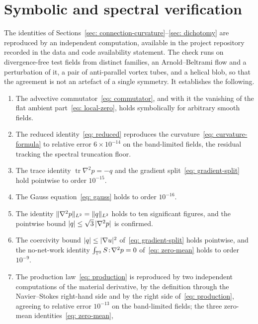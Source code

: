 \section{Symbolic and spectral verification}
\label{app: verification}

The identities of Sections~\ref{sec: connection-curvature}--\ref{sec: dichotomy}
are reproduced by an independent computation, available in the project repository
recorded in the data and code availability statement. The check runs on
divergence-free test fields from distinct families, an Arnold--Beltrami flow and
a perturbation of it, a pair of anti-parallel vortex tubes, and a helical blob,
so that the agreement is not an artefact of a single symmetry. It establishes the
following.
\begin{enumerate}
  \item The advective commutator~\eqref{eq: commutator}, and with it the vanishing
        of the flat ambient part~\eqref{eq: local-zero}, holds symbolically for
        arbitrary smooth fields.
  \item The reduced identity~\eqref{eq: reduced} reproduces the
        curvature~\eqref{eq: curvature-formula} to relative error
        $6\times 10^{-14}$ on the band-limited fields, the residual tracking the
        spectral truncation floor.
  \item The trace identity $\operatorname{tr}\nabla^2 p = -q$ and the gradient
        split~\eqref{eq: gradient-split} hold pointwise to order $10^{-15}$.
  \item The Gauss equation~\eqref{eq: gauss} holds to order $10^{-16}$.
  \item The identity $\lVert \nabla^2 p \rVert_{L^2} = \lVert q \rVert_{L^2}$ holds to ten
        significant figures, and the pointwise bound
        $\lvert q \rvert \le \sqrt{3}\,\lvert \nabla^2 p \rvert$ is confirmed.
  \item The coercivity bound $\lvert q \rvert \le \lvert \nabla u \rvert^2$
        of~\eqref{eq: gradient-split} holds pointwise, and the no-net-work identity
        $\int_{\mathbb{T}^3} S\!:\!\nabla^2 p = 0$ of~\eqref{eq: zero-mean} holds to order
        $10^{-9}$.
  \item The production law~\eqref{eq: production} is reproduced by two independent
        computations of the material derivative, by the definition through the
        Navier--Stokes right-hand side and by the right side
        of~\eqref{eq: production}, agreeing to relative error $10^{-13}$ on the
        band-limited fields; the three zero-mean identities~\eqref{eq: zero-mean},

\end{enumerate}
